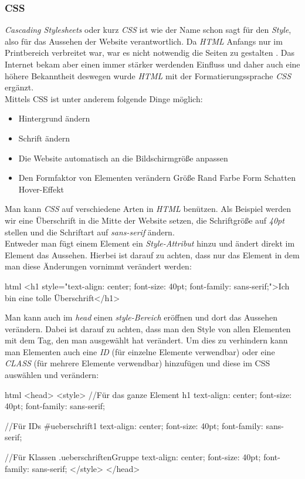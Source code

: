 		\subsubsection{CSS}
		\textit{Cascading Stylesheets} oder kurz \textit{CSS} ist wie der Name schon sagt für den \textit{Style}, also für das Aussehen der Website verantwortlich. Da \textit{HTML} Anfangs nur im Printbereich verbreitet war, war es nicht notwendig die Seiten zu gestalten \cite{html5-css3-def, html5-css3-handbuch}. Das Internet bekam aber einen immer stärker werdenden Einfluss und daher auch eine höhere Bekanntheit deswegen wurde \textit{HTML} mit der Formatierungssprache \textit{CSS} ergänzt.\\
		Mittels CSS ist unter anderem folgende Dinge möglich:
		\begin{itemize}
			\item Hintergrund ändern
			\item Schrift ändern
			\item Die Website automatisch an die Bildschirmgröße anpassen
			\item Den Formfaktor von Elementen verändern
			\subitem Größe
			\subitem Rand
			\subitem Farbe
			\subitem Form
			\subitem Schatten
			\subitem Hover-Effekt
		\end{itemize}
		Man kann \textit{CSS} auf verschiedene Arten in \textit{HTML} benützen. Als Beispiel werden wir eine Überschrift in die Mitte der Website setzen, die Schriftgröße auf \textit{40pt} stellen und die Schriftart auf \textit{sans-serif} ändern.\\
		Entweder man fügt einem Element ein \textit{Style-Attribut} hinzu und ändert direkt im Element das Aussehen. Hierbei ist darauf zu achten, dass nur das Element in dem man diese Änderungen vornimmt verändert werden:
		\begin{code}{html}
			<h1 style="text-align: center; font-size: 40pt; font-family: sans-serif;">Ich bin eine tolle Überschrift</h1>
		\end{code}
		Man kann auch im \textit{head} einen \textit{style-Bereich} eröffnen und dort das Aussehen verändern. Dabei ist darauf zu achten, dass man den Style von allen Elementen mit dem Tag, den man ausgewählt hat verändert. Um dies zu verhindern kann man Elementen auch eine \textit{ID} (für einzelne Elemente verwendbar) oder eine \textit{CLASS} (für mehrere Elemente verwendbar) hinzufügen und diese im CSS auswählen und verändern:
		\begin{code}{html}
				<head>
					<style>
					//Für das ganze Element
					h1 {
						text-align: center; 
						font-size: 40pt; 
						font-family: sans-serif;
					}
				
					//Für IDs
					#ueberschrift1 {
						text-align: center; 
						font-size: 40pt; 
						font-family: sans-serif;
					}
					
					//Für Klassen
					.ueberschriftenGruppe {
						text-align: center; 
						font-size: 40pt; 
						font-family: sans-serif;
					}
					</style>
				</head>
		\end{code}
